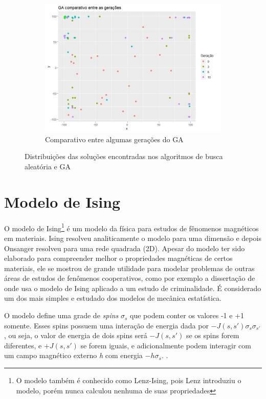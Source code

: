 \begin{figure}[ht]
\begin{subfigure}[b]{0.65\linewidth}
		\includegraphics[width=\linewidth]{imagens/scatter_GA_P30_T10b.png}
		\caption{Comparativo entre algumas gerações do GA}
	\end{subfigure}
	\caption{Distribuições das soluções encontradas nos algoritmos de busca aleatória e GA}
	\label{fig:scatter_RS_GA}
\end{figure}



\section{Modelo de Ising}

O modelo de Ising\footnote{O modelo também é conhecido como Lenz-Ising, pois Lenz introduziu o modelo, porém nunca calculou nenhuma de suas propriedades} é um modelo da física para estudos de fênomenos magnéticos em materiais. Ising resolveu analiticamente o modelo para uma dimensão e depois Onsanger resolveu para uma rede quadrada (2D). Apesar do modelo ter sido elaborado para compreender melhor o propriedades magnéticas de certos materiais, ele se mostrou de grande utilidade para modelar problemas de outras áreas de estudos de fenômenos cooperativos, como por exemplo a dissertação de  onde usa o modelo de Ising aplicado a um estudo de criminalidade. É considerado um dos mais simples e estudado dos modelos de mecânica estatística.

O modelo define uma grade de \textit{spins} \(\sigma_s\) que podem conter os valores -1 e +1 somente. Esses spins possuem uma interação de energia dada por \(-J(s, s')\sigma_s\sigma_{s'}\), ou seja, o valor de energia de dois spins será \(-J(s, s')\) se os spins forem diferentes, e \(+J(s, s')\) se forem iguais, e adicionalmente podem interagir com um campo magnético externo \textit{h} com energia \(-h\sigma_s\). \cite{McCoy1973}.

